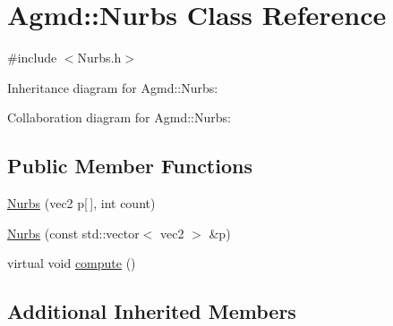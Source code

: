 \hypertarget{class_agmd_1_1_nurbs}{\section{Agmd\+:\+:Nurbs Class Reference}
\label{class_agmd_1_1_nurbs}
}


{\ttfamily \#include $<$Nurbs.\+h$>$}



Inheritance diagram for Agmd\+:\+:Nurbs\+:


Collaboration diagram for Agmd\+:\+:Nurbs\+:
\subsection*{Public Member Functions}
\begin{DoxyCompactItemize}
\item 
\hyperlink{class_agmd_1_1_nurbs_a8b818f46c41cec7653145d719d83c35f}{Nurbs} (vec2 p\mbox{[}$\,$\mbox{]}, int count)
\item 
\hyperlink{class_agmd_1_1_nurbs_a8bb8f6a838c13cf231b14774cff1daaa}{Nurbs} (const std\+::vector$<$ vec2 $>$ \&p)
\item 
virtual void \hyperlink{class_agmd_1_1_nurbs_a8d2c4d1307a198fd0aafcdc464f2ba7e}{compute} ()
\end{DoxyCompactItemize}
\subsection*{Additional Inherited Members}


